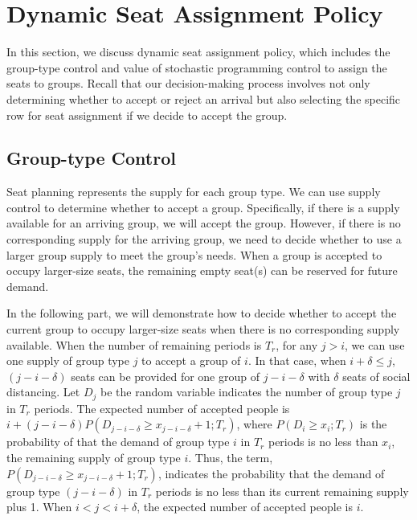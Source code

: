 \section{Dynamic Seat Assignment Policy}
In this section, we discuss dynamic seat assignment policy, which includes the group-type control and value of stochastic programming control to assign the seats to groups. Recall that our decision-making process involves not only determining whether to accept or reject an arrival but also selecting the specific row for seat assignment if we decide to accept the group.




\subsection{Group-type Control}\label{nested_policy}
Seat planning represents the supply for each group type. We can use supply control to determine whether to accept a group. Specifically, if there is a supply available for an arriving group, we will accept the group. However, if there is no corresponding supply for the arriving group, we need to decide whether to use a larger group supply to meet the group's needs. When a group is accepted to occupy larger-size seats, the remaining empty seat(s) can be reserved for future demand.

In the following part, we will demonstrate how to decide whether to accept the current group to occupy larger-size seats when there is no corresponding supply available. When the number of remaining periods is $T_r$, for any $j>i$, we can use one supply of group type $j$ to accept a group of $i$. In that case, when $i+\delta \leq j$, $(j-i-\delta)$ seats can be provided for one group of $j-i-\delta$ with $\delta$ seats of social distancing. Let $D_j$ be the random variable indicates the number of group type $j$ in $T_r$ periods. The expected number of accepted people is $i + (j-i-\delta)P(D_{j-i-\delta} \geq x_{j-i-\delta}+1; T_r)$, where $P(D_i \geq x_i; T_r)$ is the probability of that the demand of group type $i$ in $T_r$ periods is no less than $x_i$, the remaining supply of group type $i$. Thus, the term, $P(D_{j-i-\delta} \geq x_{j-i-\delta}+1; T_r)$, indicates the probability that the demand of group type $(j-i-\delta)$ in $T_r$ periods is no less than its current remaining supply plus 1. When $i <j < i+\delta$, the expected number of accepted people is $i$.

